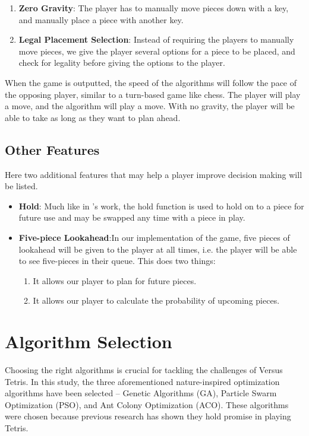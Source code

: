 \documentclass[a4paper, 12pt]{extreport}
\begin{document}
	\begin{enumerate}
		\item \textbf{Zero Gravity}: The player has to manually move pieces down with a key, and manually place a piece with another key.
		\item \textbf{Legal Placement Selection}: Instead of requiring the players to manually move pieces, we give the player several options for a piece to be placed, and check for legality before giving the options to the player.
	\end{enumerate}
	
	When the game is outputted, the speed of the algorithms will follow the pace of the opposing player, similar to a turn-based game like chess. The player will play a move, and the algorithm will play a move. With no gravity, the player will be able to take as long as they want to plan ahead.
	
	\subsection{Other Features}
	
	Here two additional features that may help a player improve decision making will be listed.
	
	\begin{itemize}
		\item \textbf{Hold}: Much like in \citeauthor{tetris-drl-2}'s \cite{tetris-drl-2} work, the hold function is used to hold on to a piece for future use and may be swapped any time with a piece in play.
		\item \textbf{Five-piece Lookahead}:In our implementation of the game, five pieces of lookahead will be given to the player at all times, i.e. the player will be able to see five-pieces in their queue. This does two things:
		\begin{enumerate}
			\item It allows our player to plan for future pieces.
			\item It allows our player to calculate the probability of upcoming pieces.
		\end{enumerate}
	\end{itemize}
	
	\section{Algorithm Selection}\label{sec:algo-select}
	Choosing the right algorithms is crucial for tackling the challenges of Versus Tetris. In this study, the three aforementioned nature-inspired optimization algorithms have been selected -- Genetic Algorithms (GA), Particle Swarm Optimization (PSO), and Ant Colony Optimization (ACO). These algorithms were chosen because previous research has shown they hold promise in playing Tetris.
	
\end{document}
